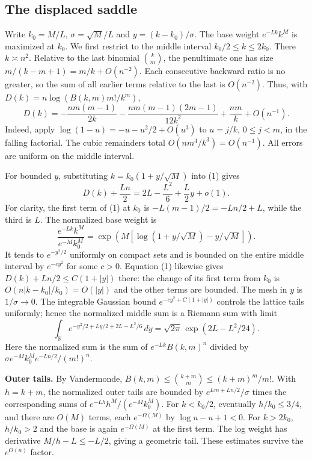 \documentclass[11pt,a4paper]{article}
\numberwithin{equation}{section}
\theoremstyle{definition}
\theoremstyle{remark}
\begin{document}
\subsection*{The displaced saddle}
Write $k_0=M/L$, $\sigma=\sqrt M/L$ and $y=(k-k_0)/\sigma$. The base weight $e^{-Lk}k^M$ is maximized at $k_0$. We first restrict to the middle interval $k_0/2\le k\le2k_0$. There $k\asymp n^2$. Relative to the last binomial $\binom{k}{m}$, the penultimate one has size $m/(k-m+1)=m/k+O(n^{-2})$. Each consecutive backward ratio is no greater, so the sum of all earlier terms relative to the last is $O(n^{-2})$. Thus, with $D(k)=n\log(B(k,m)m!/k^m)$,
\[
 D(k)= -\frac{nm(m-1)}{2k}
 -\frac{nm(m-1)(2m-1)}{12k^2}+\frac{nm}{k}+O(n^{-1}). \tag{1}
\]
Indeed, apply $\log(1-u)=-u-u^2/2+O(u^3)$ to $u=j/k$, $0\le j<m$, in the falling factorial. The cubic remainders total $O(nm^4/k^3)=O(n^{-1})$. All errors are uniform on the middle interval.

For bounded $y$, substituting $k=k_0(1+y/\sqrt M)$ into (1) gives
\[
 D(k)+\frac{Ln}{2}=2L-\frac{L^2}{6}+\frac L2y+o(1). \tag{2}
\]
For clarity, the first term of (1) at $k_0$ is $-L(m-1)/2=-Ln/2+L$, while the third is $L$. The normalized base weight is
\[
 \frac{e^{-Lk}k^M}{e^{-M}k_0^M}
 =\exp\!\left(M[\log(1+y/\sqrt M)-y/\sqrt M]\right).
\]
It tends to $e^{-y^2/2}$ uniformly on compact sets and is bounded on the entire middle interval by $e^{-c y^2}$ for some $c>0$. Equation (1) likewise gives $D(k)+Ln/2\le C(1+|y|)$ there: the change of its first term from $k_0$ is $O(n|k-k_0|/k_0)=O(|y|)$ and the other terms are bounded. The mesh in $y$ is $1/\sigma\to0$. The integrable Gaussian bound $e^{-cy^2+C(1+|y|)}$ controls the lattice tails uniformly; hence the normalized middle sum is a Riemann sum with limit
\[
 \int_{\mathbb R}e^{-y^2/2+Ly/2+2L-L^2/6}\,dy
 =\sqrt{2\pi}\,\exp(2L-L^2/24). \tag{3}
\]
Here the normalized sum is the sum of $e^{-Lk}B(k,m)^n$ divided by
$\sigma e^{-M}k_0^M e^{-Ln/2}/(m!)^n$.

\textbf{Outer tails.} By Vandermonde, $B(k,m)\le\binom{k+m}{m}\le(k+m)^m/m!$. With $h=k+m$, the normalized outer tails are bounded by $e^{Lm+Ln/2}/\sigma$ times the corresponding sums of $e^{-Lh}h^M/(e^{-M}k_0^M)$. For $k<k_0/2$, eventually $h/k_0\le 3/4$, and there are $O(M)$ terms, each $e^{-\Omega(M)}$ by $\log u-u+1<0$. For $k>2k_0$, $h/k_0>2$ and the base is again $e^{-\Omega(M)}$ at the first term. The log weight has derivative $M/h-L\le -L/2$, giving a geometric tail. These estimates survive the $e^{O(n)}$ factor.
\end{document}
